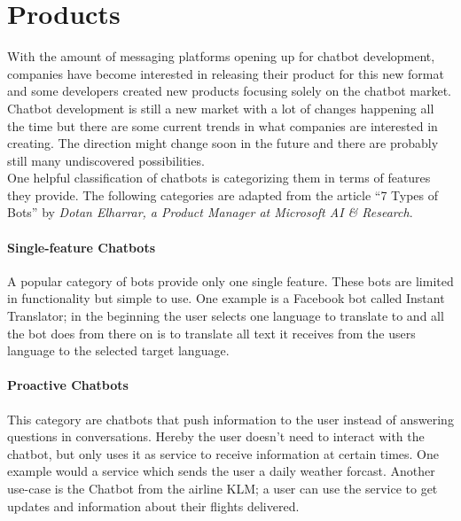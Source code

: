 \section{Products}


With the amount of messaging platforms opening up for chatbot development, companies have become interested in releasing their product for this new format and some developers created new products focusing solely on the chatbot market.
\\

Chatbot development is still a new market with a lot of changes happening all the time but there are some current trends in what companies are interested in creating. The direction might change soon in the future and there are probably still many undiscovered possibilities.
\\

One helpful classification of chatbots is categorizing them in terms of features they provide. The following categories are adapted from the article ``7 Types of Bots'' by \emph{Dotan Elharrar, a Product Manager at Microsoft AI \& Research}\cite{bottypes}.


\paragraph{Single-feature Chatbots}

A popular category of bots provide only one single feature. These bots are limited in functionality but simple to use. One example is a Facebook bot called Instant Translator\cite{instanttranslator}; in the beginning the user selects one language to translate to and all the bot does from there on is to translate all text it receives from the users language to the selected target language.


\paragraph{Proactive Chatbots}

This category are chatbots that push information to the user instead of answering questions in conversations. Hereby the user doesn't need to interact with the chatbot, but only uses it as service to receive information at certain times. One example would a service which sends the user a daily weather forcast. Another use-case is the Chatbot from the airline KLM\cite{klm}; a user can use the service to get updates and information about their flights delivered.


